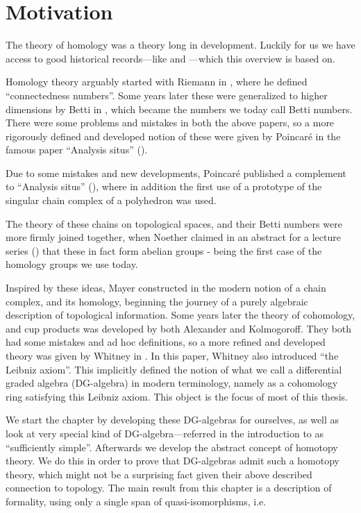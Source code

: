 
\section{Motivation}

The theory of homology was a theory long in development. Luckily for us we have access to good historical records---like \cite{history1} and \cite{history2}---which this overview is based on. 

Homology theory arguably started with Riemann in \cite{riemann}, where he defined ``connectedness numbers''. Some years later these were generalized to higher dimensions by Betti in \cite{betti}, which became the numbers we today call Betti numbers. There were some problems and mistakes in both the above papers, so a more rigorously defined and developed notion of these were given by Poincaré in the famous paper ``Analysis situs'' (\cite{situs}). 

Due to some mistakes and new developments, Poincaré published a complement to ``Analysis situs'' (\cite{situs2}), where in addition the first use of a prototype of the singular chain complex of a polyhedron was used. 

The theory of these chains on topological spaces, and their Betti numbers were more firmly joined together, when Noether claimed in an abstract for a lecture series (\cite{noether}) that these in fact form abelian groups - being the first case of the homology groups we use today. 

Inspired by these ideas, Mayer constructed in \cite{mayer, mayer2} the modern notion of a chain complex, and its homology, beginning the journey of a purely algebraic description of topological information. Some years later the theory of cohomology, and cup products was developed by both Alexander and Kolmogoroff. They both had some mistakes and ad hoc definitions, so a more refined and developed theory was given by Whitney in \cite{whitney}. In this paper, Whitney also introduced ``the Leibniz axiom''. This implicitly defined the notion of what we call a differential graded algebra (DG-algebra) in modern terminology, namely as a cohomology ring satisfying this Leibniz axiom. This object is the focus of most of this thesis.

We start the chapter by developing these DG-algebras for ourselves, as well as look at very special kind of DG-algebra---referred in the introduction to as ``sufficiently simple''. Afterwards we develop the abstract concept of homotopy theory. We do this in order to prove that DG-algebras admit such a homotopy theory, which might not be a surprising fact given their above described connection to topology. The main result from this chapter is a description of formality, using only a single span of quasi-isomorphisms, i.e. 

